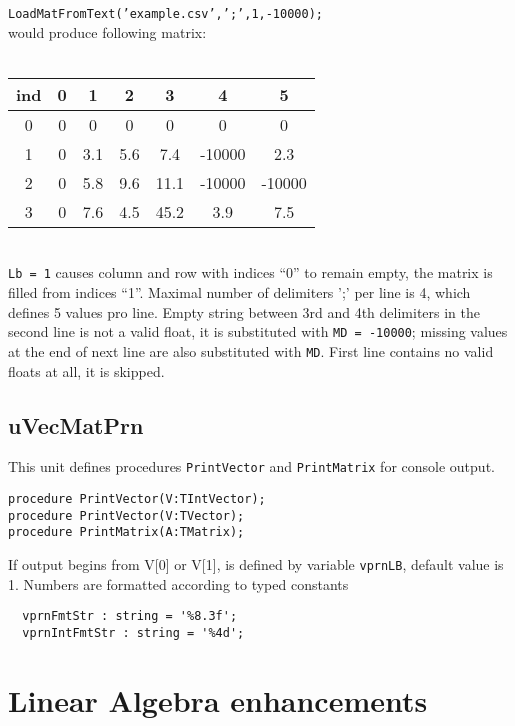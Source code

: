 \documentclass[12pt,a4paper,oneside]{article}
\newcommand{\code}[1]{\texttt{#1}}
\begin{document}
\code{LoadMatFromText('example.csv',';',1,-10000);}\\ would produce following matrix: \\ \\
\begin{tabular}{c|cccccc}
	ind & 0 & 1 & 2 & 3 & 4 & 5 \\
	\hline 
	0 & 0 & 0 & 0 & 0 & 0 & 0 \\ 
 
	1 & 0 & 3.1 & 5.6 & 7.4 & -10000 & 2.3 \\ 
	
	2 & 0 & 5.8 & 9.6 & 11.1 & -10000 & -10000 \\ 
	
	3 & 0 & 7.6 & 4.5 & 45.2 & 3.9 & 7.5 \\ 
\end{tabular} \\  \vskip 2pt
\code{Lb = 1} causes column and row with indices ``0'' to remain empty, the matrix is filled from indices ``1''. Maximal number of delimiters ';' per line is 4, which defines 5 values pro line. Empty string between 3rd and 4th delimiters in the second line is not a valid float, it is substituted with \code{MD = -10000}; missing values at the end of next line are also substituted with \code{MD}. First line contains no valid floats at all, it is skipped.
\subsection{uVecMatPrn}
This unit defines procedures \code{PrintVector} and \code{PrintMatrix} for console output.
\begin{verbatim}
procedure PrintVector(V:TIntVector);
procedure PrintVector(V:TVector);
procedure PrintMatrix(A:TMatrix);
\end{verbatim} 
If output begins from V[0] or V[1], is defined by variable \code{vprnLB}, default value is 1. Numbers are formatted according to typed constants 
\begin{verbatim}
  vprnFmtStr : string = '%8.3f';
  vprnIntFmtStr : string = '%4d';
\end{verbatim}
 
\section{Linear Algebra enhancements}
\end{document}
